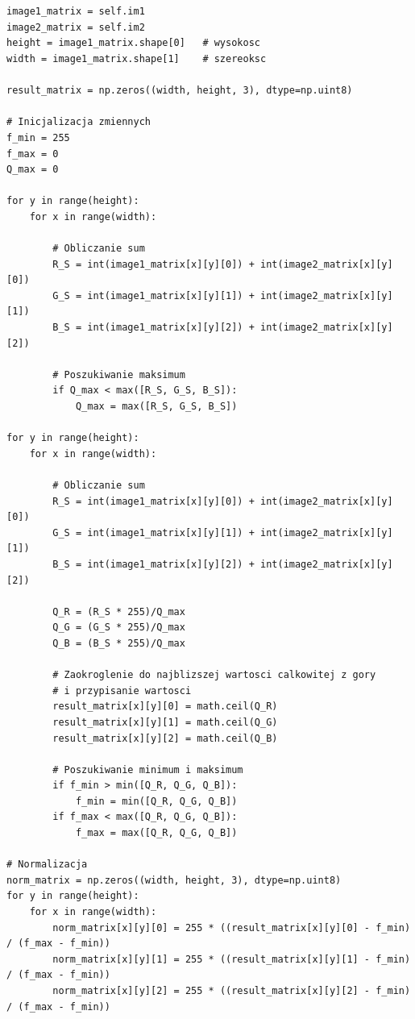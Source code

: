 \documentclass[final,a4paper,openany,12pt]{mwbk}
\begin{document}
\begin{lstlisting}[caption= Dzielenie obrazu barwowego przez inny obraz]


image1_matrix = self.im1
image2_matrix = self.im2
height = image1_matrix.shape[0]   # wysokosc
width = image1_matrix.shape[1]    # szereoksc

result_matrix = np.zeros((width, height, 3), dtype=np.uint8)

# Inicjalizacja zmiennych
f_min = 255
f_max = 0
Q_max = 0

for y in range(height):
    for x in range(width):  

        # Obliczanie sum
        R_S = int(image1_matrix[x][y][0]) + int(image2_matrix[x][y][0])
        G_S = int(image1_matrix[x][y][1]) + int(image2_matrix[x][y][1])
        B_S = int(image1_matrix[x][y][2]) + int(image2_matrix[x][y][2])

        # Poszukiwanie maksimum
        if Q_max < max([R_S, G_S, B_S]):
            Q_max = max([R_S, G_S, B_S])

for y in range(height):
    for x in range(width):  

        # Obliczanie sum
        R_S = int(image1_matrix[x][y][0]) + int(image2_matrix[x][y][0])
        G_S = int(image1_matrix[x][y][1]) + int(image2_matrix[x][y][1])
        B_S = int(image1_matrix[x][y][2]) + int(image2_matrix[x][y][2])

        Q_R = (R_S * 255)/Q_max
        Q_G = (G_S * 255)/Q_max
        Q_B = (B_S * 255)/Q_max

        # Zaokroglenie do najblizszej wartosci calkowitej z gory
        # i przypisanie wartosci
        result_matrix[x][y][0] = math.ceil(Q_R)
        result_matrix[x][y][1] = math.ceil(Q_G)
        result_matrix[x][y][2] = math.ceil(Q_B)

        # Poszukiwanie minimum i maksimum                
        if f_min > min([Q_R, Q_G, Q_B]):
            f_min = min([Q_R, Q_G, Q_B])
        if f_max < max([Q_R, Q_G, Q_B]):
            f_max = max([Q_R, Q_G, Q_B])

# Normalizacja
norm_matrix = np.zeros((width, height, 3), dtype=np.uint8)
for y in range(height):
    for x in range(width):
        norm_matrix[x][y][0] = 255 * ((result_matrix[x][y][0] - f_min) / (f_max - f_min))
        norm_matrix[x][y][1] = 255 * ((result_matrix[x][y][1] - f_min) / (f_max - f_min))
        norm_matrix[x][y][2] = 255 * ((result_matrix[x][y][2] - f_min) / (f_max - f_min))

\end{lstlisting}
\newpage
\end{document}
